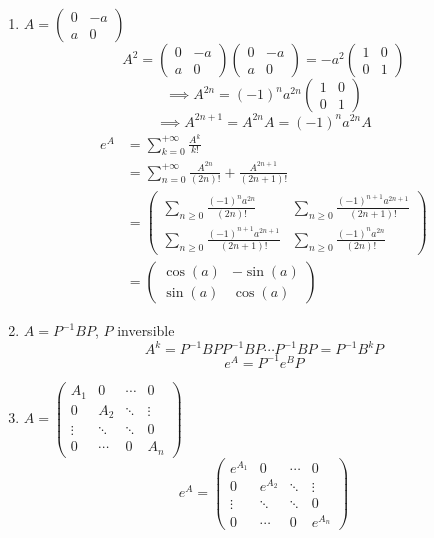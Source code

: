 \documentclass[]{report}
\begin{document}
\begin{ex}{}{}
    \begin{enumerate}
        \item $A=\begin{pmatrix}
            0&-a\\
            a&0
        \end{pmatrix}$
        \[A^2=\begin{pmatrix}
            0&-a\\
            a&0
        \end{pmatrix}\begin{pmatrix}
            0&-a\\
            a&0
        \end{pmatrix}=-a^2\begin{pmatrix}
            1&0\\
            0&1
        \end{pmatrix}\]
        \[\implies A^{2n}=(-1)^na^{2n}\begin{pmatrix}
            1&0\\
            0&1
        \end{pmatrix}\]
        \[\implies A^{2n+1}=A^{2n}A=(-1)^n a^{2n}A\]
        \begin{align*}
            e^A&=\sum_{k=0}^{+\infty}\frac{A^k}{k!}\\
            &=\sum_{n=0}^{+\infty}\frac{A^{2n}}{(2n)!}+\frac{A^{2n+1}}{(2n+1)!}\\
            &=\begin{pmatrix}
                \sum_{n\ge 0} \frac{(-1)^na^{2n}}{(2n)!}& \sum_{n\ge 0} \frac{(-1)^{n+1}a^{2n+1}}{(2n+1)!}\\
                \sum_{n\ge 0} \frac{(-1)^{n+1}a^{2n+1}}{(2n+1)!}& \sum_{n\ge 0} \frac{(-1)^na^{2n}}{(2n)!}
            \end{pmatrix}\\
            &=\begin{pmatrix}
                \cos (a)& -\sin (a)\\
                \sin (a)& \cos (a)
            \end{pmatrix}
        \end{align*}
        \item $A=P^{-1}BP$, $P$ inversible
        \[A^k=P^{-1}BPP^{-1}BP\cdots P^{-1}BP=P^{-1}B^kP\]
        \[e^A=P^{-1}e^BP\]
        \item $A=\begin{pmatrix}
            \boxed{A_1}&0&\cdots&0\\
            0&\boxed{A_2}&\ddots&\vdots\\
            \vdots&\ddots&\ddots&0\\
            0&\cdots&0&\boxed{A_n}
        \end{pmatrix}$
        \[e^A=\begin{pmatrix}
            \boxed{e^{A_1}}&0&\cdots&0\\
            0&\boxed{e^{A_2}}&\ddots&\vdots\\
            \vdots&\ddots&\ddots&0\\
            0&\cdots&0&\boxed{e^{A_n}}
        \end{pmatrix}\]


\end{enumerate}
\end{ex}
\end{document}
